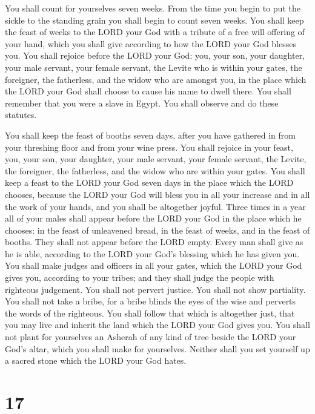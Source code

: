  You shall count for yourselves seven weeks. From the time
you begin to put the sickle to the standing grain you shall begin to
count seven weeks.  You shall keep the feast of weeks to
the LORD your God with a tribute of a free will offering of your hand,
which you shall give according to how the LORD your God blesses you.
 You shall rejoice before the LORD your God: you, your son,
your daughter, your male servant, your female servant, the Levite who is
within your gates, the foreigner, the fatherless, and the widow who are
amongst you, in the place which the LORD your God shall choose to cause
his name to dwell there.  You shall remember that you were
a slave in Egypt. You shall observe and do these statutes.

 You shall keep the feast of booths seven days, after you
have gathered in from your threshing floor and from your wine press.
 You shall rejoice in your feast, you, your son, your
daughter, your male servant, your female servant, the Levite, the
foreigner, the fatherless, and the widow who are within your gates.
 You shall keep a feast to the LORD your God seven days in
the place which the LORD chooses, because the LORD your God will bless
you in all your increase and in all the work of your hands, and you
shall be altogether joyful.  Three times in a year all of
your males shall appear before the LORD your God in the place which he
chooses: in the feast of unleavened bread, in the feast of weeks, and in
the feast of booths. They shall not appear before the LORD empty.
 Every man shall give as he is able, according to the LORD
your God's blessing which he has given you.  You shall make
judges and officers in all your gates, which the LORD your God gives
you, according to your tribes; and they shall judge the people with
righteous judgement.  You shall not pervert justice. You
shall not show partiality. You shall not take a bribe, for a bribe
blinds the eyes of the wise and perverts the words of the righteous.
 You shall follow that which is altogether just, that you
may live and inherit the land which the LORD your God gives you.
 You shall not plant for yourselves an Asherah of any kind
of tree beside the LORD your God's altar, which you shall make for
yourselves.  Neither shall you set yourself up a sacred
stone which the LORD your God hates.

\hypertarget{section-16}{%
\section{17}\label{section-16}}

